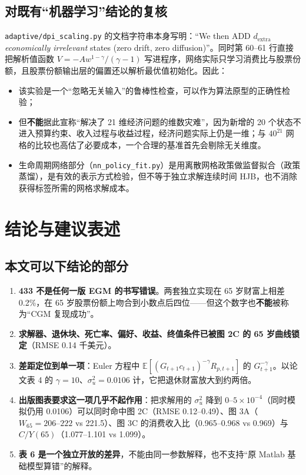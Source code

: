 \documentclass[UTF8,a4paper,11pt,fontset=fandol]{ctexart}
\newcommand{\su}{\sigma_u^2}
\begin{document}
\subsection{对既有“机器学习”结论的复核}
\texttt{adaptive/dpi\_scaling.py} 的文档字符串本身写明：“We then ADD \(d_{\text{extra}}\) \emph{economically irrelevant} states (zero drift, zero diffusion)”。同时第 60--61 行直接把解析值函数 \(V=-A w^{1-\gamma}/(\gamma-1)\) 写进程序，网络实际只学习消费比与股票份额，且股票份额输出层的偏置还以解析最优值初始化。因此：
\begin{itemize}[leftmargin=1.6em,itemsep=1pt]
\item 该实验是一个“忽略无关输入”的鲁棒性检查，可以作为算法原型的正确性检验；
\item 但\textbf{不能}据此宣称“解决了 21 维经济问题的维数灾难”，因为新增的 20 个状态不进入预算约束、收入过程与收益过程，经济问题实际上仍是一维；与 \(40^{21}\) 网格的比较也高估了必要成本，一个合理的基准首先会剔除无关维度。
\item 生命周期网络部分（\texttt{nn\_policy\_fit.py}）是用离散网格政策做监督拟合（政策蒸馏），是有效的表示方式检验，但不等于独立求解连续时间 HJB，也不消除获得标签所需的网格求解成本。
\end{itemize}

\section{结论与建议表述}

\subsection{本文可以下结论的部分}
\begin{enumerate}[leftmargin=2.2em,itemsep=2pt]
\item \textbf{433 不是任何一版 EGM 的书写错误}。两套独立实现在 65 岁财富上相差 0.2\%，在 65 岁股票份额上吻合到小数点后四位——但这个数字也\textbf{不能}被称为“CGM 复现成功”。
\item \textbf{求解器、退休块、死亡率、偏好、收益、终值条件已被图 2C 的 65 岁曲线锁定}（RMSE 0.14 千美元）。
\item \textbf{差距定位到单一项}：Euler 方程中 \(\mathbb{E}[(G_{t+1}c_{t+1})^{-\gamma}R_{p,t+1}]\) 的 \(G_{t+1}^{-\gamma}\)。以论文表 4 的 \(\gamma=10\)、\(\su=0.0106\) 计，它把退休财富放大到约两倍。
\item \textbf{出版图表要求这一项几乎不起作用}：把求解用的 \(\su\) 降到 \(0\text{--}5\times10^{-4}\)（同时模拟仍用 0.0106）可以同时命中图 2C（RMSE 0.12--0.49）、图 3A（\(W_{65}=206\text{--}222\) vs 221.5）、图 3C 的消费收入比（0.965--0.968 vs 0.969）与 \(C/Y(65)\)（1.077--1.101 vs 1.099）。
\item \textbf{表 6 是一个独立开放的差异}，不能由同一参数解释，也不支持“原 Matlab 基础模型算错”的解释。
\end{enumerate}
\end{document}
